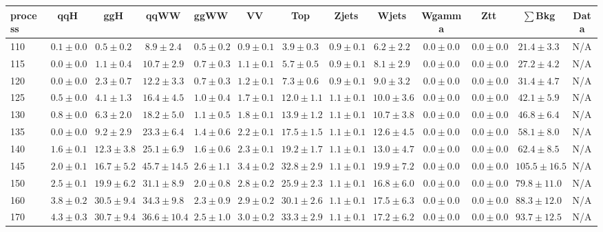 \begin{table}
{%
 \tiny
 \begin{center}
 \begin{tabular}{l | c c | c c c c c c c c  | c c}
 \hline
 process & qqH & ggH & qqWW & ggWW & VV & Top & Zjets & Wjets & Wgamma & Ztt & $\sum$Bkg & Data \\
 \hline
110 & $0.1\pm0.0$ & $0.5\pm0.2$ & $8.9\pm2.4$ & $0.5\pm0.2$ & $0.9\pm0.1$ & $3.9\pm0.3$ & $0.9\pm0.1$ & $6.2\pm2.2$ & $0.0\pm0.0$ & $0.0\pm0.0$ & $21.4\pm3.3$ & N/A \\
115 & $0.0\pm0.0$ & $1.1\pm0.4$ & $10.7\pm2.9$ & $0.7\pm0.3$ & $1.1\pm0.1$ & $5.7\pm0.5$ & $0.9\pm0.1$ & $8.1\pm2.9$ & $0.0\pm0.0$ & $0.0\pm0.0$ & $27.2\pm4.2$ & N/A \\
120 & $0.0\pm0.0$ & $2.3\pm0.7$ & $12.2\pm3.3$ & $0.7\pm0.3$ & $1.2\pm0.1$ & $7.3\pm0.6$ & $0.9\pm0.1$ & $9.0\pm3.2$ & $0.0\pm0.0$ & $0.0\pm0.0$ & $31.4\pm4.7$ & N/A \\
125 & $0.5\pm0.0$ & $4.1\pm1.3$ & $16.4\pm4.5$ & $1.0\pm0.4$ & $1.7\pm0.1$ & $12.0\pm1.1$ & $1.1\pm0.1$ & $10.0\pm3.6$ & $0.0\pm0.0$ & $0.0\pm0.0$ & $42.1\pm5.9$ & N/A \\
130 & $0.8\pm0.0$ & $6.3\pm2.0$ & $18.2\pm5.0$ & $1.1\pm0.5$ & $1.8\pm0.1$ & $13.9\pm1.2$ & $1.1\pm0.1$ & $10.7\pm3.8$ & $0.0\pm0.0$ & $0.0\pm0.0$ & $46.8\pm6.4$ & N/A \\
135 & $0.0\pm0.0$ & $9.2\pm2.9$ & $23.3\pm6.4$ & $1.4\pm0.6$ & $2.2\pm0.1$ & $17.5\pm1.5$ & $1.1\pm0.1$ & $12.6\pm4.5$ & $0.0\pm0.0$ & $0.0\pm0.0$ & $58.1\pm8.0$ & N/A \\
140 & $1.6\pm0.1$ & $12.3\pm3.8$ & $25.1\pm6.9$ & $1.6\pm0.6$ & $2.3\pm0.1$ & $19.2\pm1.7$ & $1.1\pm0.1$ & $13.0\pm4.7$ & $0.0\pm0.0$ & $0.0\pm0.0$ & $62.4\pm8.5$ & N/A \\
145 & $2.0\pm0.1$ & $16.7\pm5.2$ & $45.7\pm14.5$ & $2.6\pm1.1$ & $3.4\pm0.2$ & $32.8\pm2.9$ & $1.1\pm0.1$ & $19.9\pm7.2$ & $0.0\pm0.0$ & $0.0\pm0.0$ & $105.5\pm16.5$ & N/A \\
150 & $2.5\pm0.1$ & $19.9\pm6.2$ & $31.1\pm8.9$ & $2.0\pm0.8$ & $2.8\pm0.2$ & $25.9\pm2.3$ & $1.1\pm0.1$ & $16.8\pm6.0$ & $0.0\pm0.0$ & $0.0\pm0.0$ & $79.8\pm11.0$ & N/A \\
160 & $3.8\pm0.2$ & $30.5\pm9.4$ & $34.3\pm9.8$ & $2.3\pm0.9$ & $2.9\pm0.2$ & $30.1\pm2.6$ & $1.1\pm0.1$ & $17.5\pm6.3$ & $0.0\pm0.0$ & $0.0\pm0.0$ & $88.3\pm12.0$ & N/A \\
170 & $4.3\pm0.3$ & $30.7\pm9.4$ & $36.6\pm10.4$ & $2.5\pm1.0$ & $3.0\pm0.2$ & $33.3\pm2.9$ & $1.1\pm0.1$ & $17.2\pm6.2$ & $0.0\pm0.0$ & $0.0\pm0.0$ & $93.7\pm12.5$ & N/A \\

\end{tabular}
\end{center}}
\end{table}
